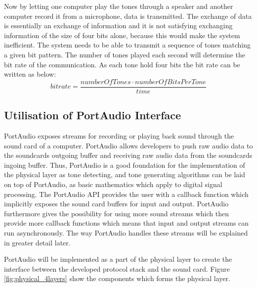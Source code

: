 	Now by letting one computer play the tones through a speaker and another computer record it from
	a microphone, data is transmitted. The exchange of data is essentially an exchange
	of information and it is not satisfying exchanging information of the size of four bits alone,
	because this would make the system inefficient. The system needs to be able to transmit a sequence
	of tones matching a given bit pattern. The number of tones played each second will determine the
	bit rate of the communication. As each tone hold four bits the bit rate can be written as below:
	\begin{equation}bitrate = \frac{numberOfTones \cdot numberOfBitsPerTone}{time}\end{equation}
	
	\subsection{Utilisation of PortAudio Interface}
	PortAudio exposes streams for recording or playing back sound through the sound card of a
	computer. PortAudio allows developers to push raw audio data to the soundcards outgoing buffer and
	receiving raw audio data from the soundcards ingoing buffer. Thus, PortAudio is a good foundation for the
	implementation of the physical layer as tone detecting, and tone generating algorithms can be laid on top
	of PortAudio, as basic mathematics which apply to digital signal processing. The PortAudio API provides the
	user with a callback function which implicitly exposes the sound card buffers for input and output. PortAudio
	furthermore gives the possibility for using more sound streams which then provide more callback functions
	which means that input and output streams can run asynchronously. The way PortAudio handles these streams
	will be explained in greater detail later.
	
	PortAudio will be implemented as a part of the physical layer to create the interface between the developed
	protocol stack and the sound card. Figure \ref{fig:physical_4layers} show the components which forms the physical layer. 
	
